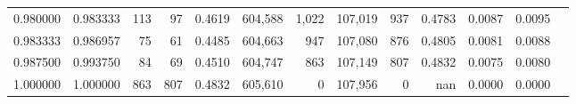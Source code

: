 \begin{tabular}{rrrrrrrrrrrrr}
0.980000 & 0.983333 &    113 &    97 &                                     0.4619 & 604,588 &   1,022 & 107,019 &     937 & 0.4783 & 0.0087 & 0.0095 \\
0.983333 & 0.986957 &     75 &    61 &                                     0.4485 & 604,663 &     947 & 107,080 &     876 & 0.4805 & 0.0081 & 0.0088 \\
0.987500 & 0.993750 &     84 &    69 &                                     0.4510 & 604,747 &     863 & 107,149 &     807 & 0.4832 & 0.0075 & 0.0080 \\
1.000000 & 1.000000 &    863 &   807 &                                     0.4832 & 605,610 &       0 & 107,956 &       0 &    nan & 0.0000 & 0.0000 \\
\bottomrule
\end{tabular}
